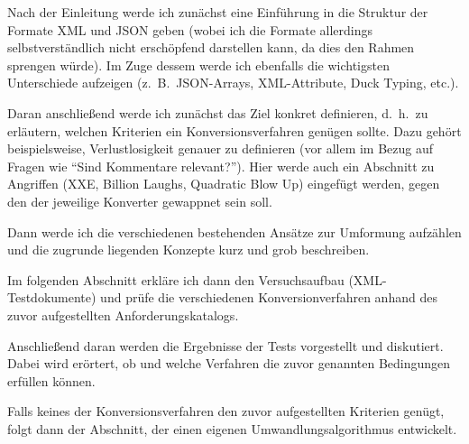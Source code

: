 \documentclass[conference]{template/IEEEtran}
\begin{document}
Nach der Einleitung werde ich zunächst eine Einführung in die Struktur der
Formate XML und JSON geben (wobei ich die Formate allerdings selbstverständlich
nicht erschöpfend darstellen kann, da dies den Rahmen sprengen würde). Im Zuge
dessem werde ich ebenfalls die wichtigsten Unterschiede aufzeigen
(z.~B.\ JSON-Arrays, XML-Attribute, Duck Typing, etc.).

Daran anschließend werde ich zunächst das Ziel konkret definieren, d.~h.\ zu
erläutern, welchen Kriterien ein Konversionsverfahren genügen sollte. Dazu
gehört beispielsweise, Verlustlosigkeit genauer zu definieren (vor allem
im Bezug auf Fragen wie \enquote{Sind Kommentare relevant?}). Hier werde auch
ein Abschnitt zu Angriffen (XXE, Billion Laughs, Quadratic Blow Up) eingefügt
werden, gegen den der jeweilige Konverter gewappnet sein soll.

Dann werde ich die verschiedenen bestehenden Ansätze zur Umformung aufzählen
und die zugrunde liegenden Konzepte kurz und grob beschreiben.

Im folgenden Abschnitt erkläre ich dann den Versuchsaufbau (XML-Testdokumente)
und prüfe die verschiedenen Konversionverfahren anhand des zuvor aufgestellten
Anforderungskatalogs.

Anschließend daran werden die Ergebnisse der Tests vorgestellt und diskutiert.
Dabei wird erörtert, ob und welche Verfahren die zuvor genannten Bedingungen
erfüllen können.

Falls keines der Konversionsverfahren den zuvor aufgestellten Kriterien genügt,
folgt dann der Abschnitt, der einen eigenen Umwandlungsalgorithmus entwickelt.



\ifCLASSOPTIONcaptionsoff{}
  \newpage
\fi
\printbibliography{}
\end{document}
